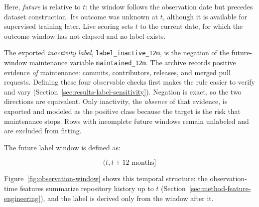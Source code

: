 Here, \emph{future} is relative to \(t\): the window follows the observation date
but precedes dataset construction. Its outcome was unknown at \(t\), although it
is available for supervised training later. Live scoring sets \(t\) to the
current date, for which the outcome window has not elapsed and no label
exists.

The exported \emph{inactivity label},
\texttt{label\_inactive\_12m}, is the negation of the future-window maintenance
variable \texttt{maintained\_12m}. The archive records positive evidence
\emph{of} maintenance: commits, contributors, releases, and merged pull requests. Defining
these four observable checks first makes the rule easier to verify and vary
(Section~\ref{sec:results-label-sensitivity}). Negation is exact, so the two
directions are equivalent. Only inactivity, the \emph{absence} of that evidence,
is exported and modeled as the positive class because the target is the risk
that maintenance stops.
Rows with incomplete future windows remain unlabeled and are excluded from
fitting.

The future label window is defined as:

\[
(t, t + 12\text{ months}]
\]

Figure~\ref{fig:observation-window} shows this temporal structure: the observation-time features summarize repository history up to \(t\) (Section~\ref{sec:method-feature-engineering}), and the label is derived only from the window after it.

